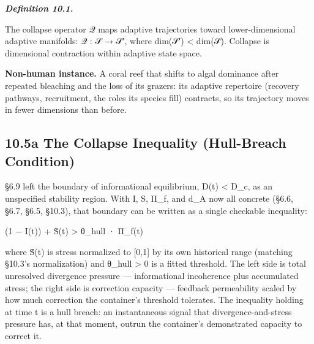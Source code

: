 \documentclass[
]{article}
\begin{document}
\emph{\textbf{Definition 10.1.}}

The collapse operator 𝒬 maps adaptive trajectories toward
lower-dimensional adaptive manifolds: 𝒬 : 𝒮 → 𝒮′, where dim(𝒮′)
\textless{} dim(𝒮). Collapse is dimensional contraction within adaptive
state space.

\textbf{Non-human instance.} A coral reef that shifts to algal dominance
after repeated bleaching and the loss of its grazers: its adaptive
repertoire (recovery pathways, recruitment, the roles its species fill)
contracts, so its trajectory moves in fewer dimensions than before.

\hypertarget{a-the-collapse-inequality-hull-breach-condition}{%
\subsection{10.5a The Collapse Inequality (Hull-Breach
Condition)}\label{a-the-collapse-inequality-hull-breach-condition}}

§6.9 left the boundary of informational equilibrium, D(t) \textless{}
D\_c, as an unspecified stability region. With I, S, Π\_f, and d\_A now
all concrete (§6.6, §6.7, §6.5, §10.3), that boundary can be written as
a single checkable inequality:

(1 − I(t)) + S̃(t) \textgreater{} θ\_hull · Π\_f(t)

where S̃(t) is stress normalized to {[}0,1{]} by its own historical range
(matching §10.3's normalization) and θ\_hull \textgreater{} 0 is a
fitted threshold. The left side is total unresolved divergence pressure
--- informational incoherence plus accumulated stress; the right side is
correction capacity --- feedback permeability scaled by how much
correction the container's threshold tolerates. The inequality holding
at time t is a hull breach: an instantaneous signal that
divergence-and-stress pressure has, at that moment, outrun the
container's demonstrated capacity to correct it.
\end{document}
